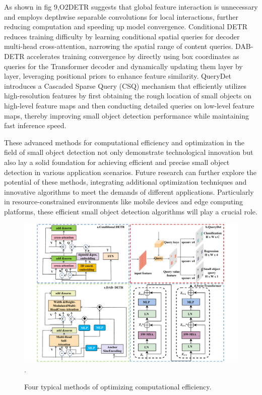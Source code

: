 \documentclass[journal]{IEEEtran}
\begin{document}
As shown in fig 9,O2DETR\cite{ma2021oriented} suggests that global feature interaction is unnecessary and employs depthwise separable convolutions for local interactions, further reducing computation and speeding up model convergence. Conditional DETR\cite{meng2021conditional} reduces training difficulty by learning conditional spatial queries for decoder multi-head cross-attention, narrowing the spatial range of content queries. DAB-DETR\cite{liu2022dab} accelerates training convergence by directly using box coordinates as queries for the Transformer decoder and dynamically updating them layer by layer, leveraging positional priors to enhance feature similarity. QueryDet\cite{yang2022querydet} introduces a Cascaded Sparse Query (CSQ) mechanism that efficiently utilizes high-resolution features by first obtaining the rough location of small objects on high-level feature maps and then conducting detailed queries on low-level feature maps, thereby improving small object detection performance while maintaining fast inference speed.

These advanced methods for computational efficiency and optimization in the field of small object detection not only demonstrate technological innovation but also lay a solid foundation for achieving efficient and precise small object detection in various application scenarios. Future research can further explore the potential of these methods, integrating additional optimization techniques and innovative algorithms to meet the demands of different applications. Particularly in resource-constrained environments like mobile devices and edge computing platforms, these efficient small object detection algorithms will play a crucial role.

\begin{figure}[htbp]
	\centering
	\setlength{\abovecaptionskip}{-0.6cm}
	\includegraphics[width=\textwidth]{fig 9}
	\DeclareGraphicsExtensions.
	\caption{Four typical methods of optimizing computational efficiency.}
	\label{fig 1}
\end{figure}
\end{document}
